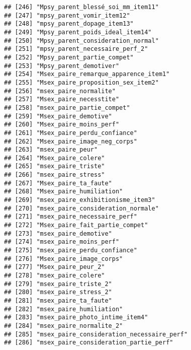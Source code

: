 \documentclass[
]{article}
\begin{document}
\begin{verbatim}
## [246] "Mpsy_parent_blessé_soi_mm_item11"                    
## [247] "mpsy_parent_vomir_item12"                            
## [248] "mpsy_parent_dopage_item13"                           
## [249] "Mpsy_parent_poids_ideal_item14"                      
## [250] "Mpsy_parent_consideration_normal"                    
## [251] "mpsy_parent_necessaire_perf_2"                       
## [252] "Mpsy_parent_partie_compet"                           
## [253] "Mpsy_parent_demotiver"                               
## [254] "Msex_paire_remarque_apparence_item1"                 
## [255] "Msex_paire_proposition_sex_item2"                    
## [256] "msex_paire_normalite"                                
## [257] "Msex_paire_necesstite"                               
## [258] "msex_paire_partie_compet"                            
## [259] "Msex_paire_demotive"                                 
## [260] "Msex_paire_moins_perf"                               
## [261] "Msex_paire_perdu_confiance"                          
## [262] "Msex_paire_image_neg_corps"                          
## [263] "msex_paire_peur"                                     
## [264] "Msex_paire_colere"                                   
## [265] "msex_paire_triste"                                   
## [266] "msex_paire_stress"                                   
## [267] "Msex_paire_ta_faute"                                 
## [268] "Msex_paire_humiliation"                              
## [269] "msex_paire_exhibitionisme_item3"                     
## [270] "msex_paire_consideration_normale"                    
## [271] "msex_paire_necessaire_perf"                          
## [272] "Msex_paire_fait_partie_compet"                       
## [273] "msex_paire_demotive"                                 
## [274] "msex_paire_moins_perf"                               
## [275] "msex_paire_perdu_confiance"                          
## [276] "Msex_paire_image_corps"                              
## [277] "Msex_paire_peur_2"                                   
## [278] "msex_paire_colere"                                   
## [279] "msex_paire_triste_2"                                 
## [280] "msex_paire_stress_2"                                 
## [281] "msex_paire_ta_faute"                                 
## [282] "msex_paire_humiliation"                              
## [283] "msex_paire_photo_intime_item4"                       
## [284] "msex_paire_normalite_2"                              
## [285] "msex_paire_consideration_necessaire_perf"            
## [286] "msex_paire_consideration_partie_perf"                

\end{verbatim}
\end{document}
